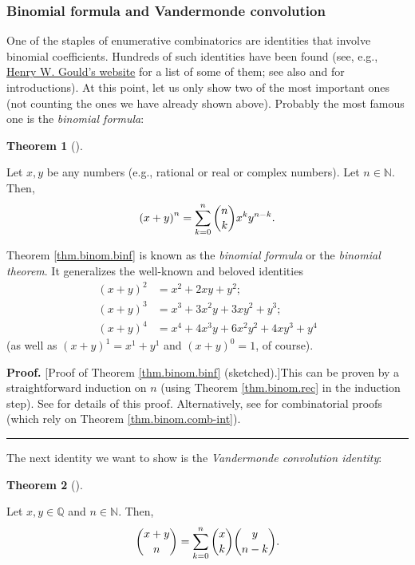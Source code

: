 \documentclass[numbers=enddot,12pt,final,onecolumn,notitlepage]{scrartcl}%
\numberwithin{exer}{subsection}
\theoremstyle{definition}
\newtheorem{theo}{Theorem}[subsection]
\newenvironment{theorem}[1][]
{\begin{theo}[#1]\begin{leftbar}}
{\end{leftbar}\end{theo}}
\newenvironment{proof}[1][Proof]{\noindent\textbf{#1.} }{\ \rule{0.5em}{0.5em}}
\let\sumnonlimits\sum
\renewcommand{\sum}{\sumnonlimits\limits}
\begin{document}
\subsubsection{Binomial formula and Vandermonde convolution}

One of the staples of enumerative combinatorics are identities that involve
binomial coefficients. Hundreds of such identities have been found (see, e.g.,
\href{http://www.math.wvu.edu/~gould/}{Henry W. Gould's website} for a list of
some of them; see also \cite[Chapter 5]{GKP} and \cite[Chapter 3]{detnotes}
for introductions). At this point, let us only show two of the most important
ones (not counting the ones we have already shown above). Probably the most
famous one is the \textit{binomial formula}:

\begin{theorem}
\label{thm.binom.binf}Let $x,y$ be any numbers (e.g., rational or real or
complex numbers). Let $n\in\mathbb{N}$. Then,%
\[
\left(  x+y\right)  ^{n}=\sum_{k=0}^{n}\dbinom{n}{k}x^{k}y^{n-k}.
\]

\end{theorem}

Theorem \ref{thm.binom.binf} is known as the \textit{binomial formula} or the
\textit{binomial theorem}. It generalizes the well-known and beloved
identities%
\begin{align*}
\left(  x+y\right)  ^{2}  &  =x^{2}+2xy+y^{2};\\
\left(  x+y\right)  ^{3}  &  =x^{3}+3x^{2}y+3xy^{2}+y^{3};\\
\left(  x+y\right)  ^{4}  &  =x^{4}+4x^{3}y+6x^{2}y^{2}+4xy^{3}+y^{4}%
\end{align*}
(as well as $\left(  x+y\right)  ^{1}=x^{1}+y^{1}$ and $\left(  x+y\right)
^{0}=1$, of course).

\begin{proof}
[Proof of Theorem \ref{thm.binom.binf} (sketched).]This can be proven by a
straightforward induction on $n$ (using Theorem \ref{thm.binom.rec} in the
induction step). See \cite[Exercise 3.6]{detnotes} for details of this proof.
Alternatively, see \cite[Identity 11.4]{Galvin} for combinatorial proofs
(which rely on Theorem \ref{thm.binom.comb-int}).
\end{proof}

The next identity we want to show is the \textit{Vandermonde convolution
identity}:

\begin{theorem}
\label{thm.binom.vandermonde}Let $x,y\in\mathbb{Q}$ and $n\in\mathbb{N}$.
Then,%
\[
\dbinom{x+y}{n}=\sum_{k=0}^{n}\dbinom{x}{k}\dbinom{y}{n-k}.
\]

\end{theorem}
\end{document}
